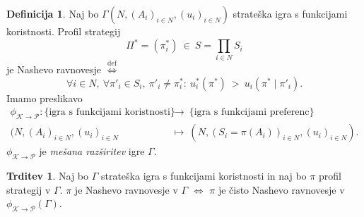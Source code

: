 \documentclass[11pt]{article}
\newcommand{\diff}{\overset{\text{def}}{\iff}}
\newcommand{\set}[1]{\{#1\}}
\theoremstyle{definition}
\newtheorem{definicija}{Definicija}[section]
\theoremstyle{definition}
\newtheorem{trditev}{Trditev}[section]
\theoremstyle{definition}
\theoremstyle{definition}
\begin{document}
\begin{definicija}

Naj bo $\Gamma(N, (A_i)_{i \in N}, (u_i)_{i \in N})$ strateška igra s funkcijami koristnosti. Profil strategij 
$$\Pi^* = (\pi_i^*) ~\in~ S = \prod_{i \in N} S_i$$
je Nashevo ravnovesje $\diff$
$$\forall i \in N, ~\forall \pi'_i \in S_i, ~\pi'_i \neq \pi_i^*: ~u_i^*(\pi^*) ~>~ u_i(\pi^* \mid \pi'_i).$$
Imamo preslikavo
\begin{align*}
\phi_{\mathscr{K} \rightarrow \mathscr{P}}: \set{\text{igra s funkcijami koristnosti}} ~&\rightarrow~ \set{\text{igra s funkcijami preferenc}} \\
(N, (A_i)_{i \in N}, (u_i)_{i \in N} ~&\mapsto~ (N, (S_i = \pi(A_i))_{i \in N}, (u_i)_{i \in N}).
\end{align*}
$\phi_{\mathscr{K} \rightarrow \mathscr{P}}$ je \textit{mešana razširitev} igre $\Gamma$.

\end{definicija}
\vspace{0.5cm}

\begin{trditev}

Naj bo $\Gamma$ strateška igra s funkcijami koristnosti in naj bo $\pi$ profil strategij v $\Gamma$. $\pi$ je Nashevo ravnovesje v $\Gamma$ $\iff$ $\pi$ je čisto Nashevo ravnovesje v $\phi_{\mathscr{K} \rightarrow \mathscr{P}}(\Gamma)$.

\end{trditev}
\vspace{0.5cm}


\pagebreak

\end{document}
